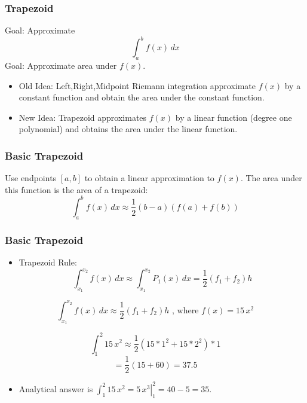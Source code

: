 \documentclass[10pt]{beamer}
\begin{document}
\begin{frame}
\frametitle{Trapezoid}
Goal:  Approximate
\begin{equation*}
\int_a^b f(x)\,dx
\end{equation*}
Goal:  Approximate area under $f(x)$.
\begin{itemize}
\item Old Idea: Left,Right,Midpoint Riemann integration approximate $f(x)$
by a constant function and obtain the area under the constant function.
\item New Idea: Trapezoid approximates $f(x)$ by a linear function
(degree one polynomial) and obtains the area under the linear function.
\end{itemize}
\end{frame}
\begin{frame}
\frametitle{Basic Trapezoid}
Use endpoints $[a,b]$ to obtain a linear approximation to $f(x)$.  The
area under this function is the area of a trapezoid:
\begin{equation*}
  \int_a^b f(x) \,dx \approx \frac{1}{2}(b-a)(f(a)+f(b))
\end{equation*}
\begin{center}
\qquad
\end{center}
\end{frame}
\begin{frame}
\frametitle{Basic Trapezoid}
\begin{itemize}
\item Trapezoid Rule:  \[\int_{x_1}^{x_2} f(x) \, dx \approx \int_{x_1}^{x_2} P_1(x)\,dx = \frac{1}{2}(f_1+f_2)h\]
\end{itemize}
 \[\int_{x_1}^{x_2} f(x) \, dx  \approx \frac{1}{2}(f_1+f_2)h \mbox{ , where } f(x) = 15\,x^2\]
\begin{example}
\[\int_{1}^{2} 15\,x^2 \approx \frac{1}{2}(15*1^2 + 15*2^2)*1\]
\[= \frac{1}{2}(15+60) = 37.5\]
\end{example}
\begin{itemize}
\item Analytical answer is $\int_{1}^{2} 15\,x^2 = \left. 5\,x^3 \right|_1^2  = 40 - 5 = 35$.
\end{itemize}
\end{frame}
\end{document}
